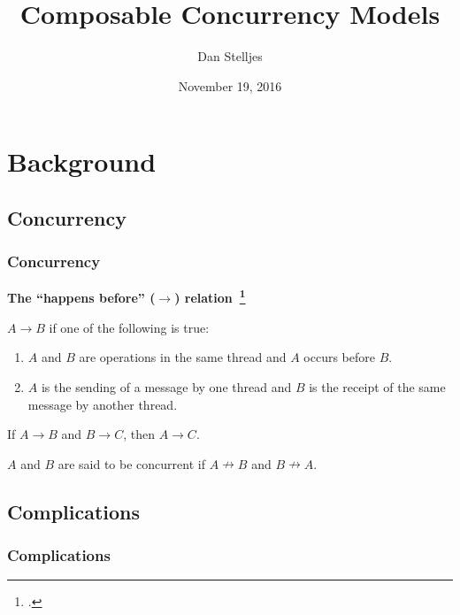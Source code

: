 \documentclass[aspectratio=1610]{beamer}
\title{Composable Concurrency Models}
\date{November 19, 2016}
\author{Dan Stelljes}
\begin{document}
  \maketitle

  \begin{frame}
    \centering
    \resizebox{0.8\linewidth}{!}{}
  \end{frame}

  \begin{frame}
    \begin{multicols}{2}
      \tableofcontents
    \end{multicols}
  \end{frame}

  \section{Background}

  \subsection{Concurrency}

  \begin{frame}
    \frametitle{Concurrency}

    \textbf{The ``happens before'' ($\rightarrow$) relation~\footcite{Lamport1977}}

    $A \rightarrow B$ if one of the following is true:

    \begin{enumerate}
      \item $A$ and $B$ are operations in the same thread and $A$ occurs before $B$.
      \item $A$ is the sending of a message by one thread and $B$ is the receipt of the same message by another thread.
    \end{enumerate}

    If $A \rightarrow B$ and $B \rightarrow C$, then $A \rightarrow C$.

    $A$ and $B$ are said to be concurrent if $A \nrightarrow B$ and $B \nrightarrow A$.
  \end{frame}

  \subsection{Complications}

  \begin{frame}
    \frametitle{Complications}

    \begin{itemize}

      \vfill

    \end{itemize}
  \end{frame}
\end{document}
